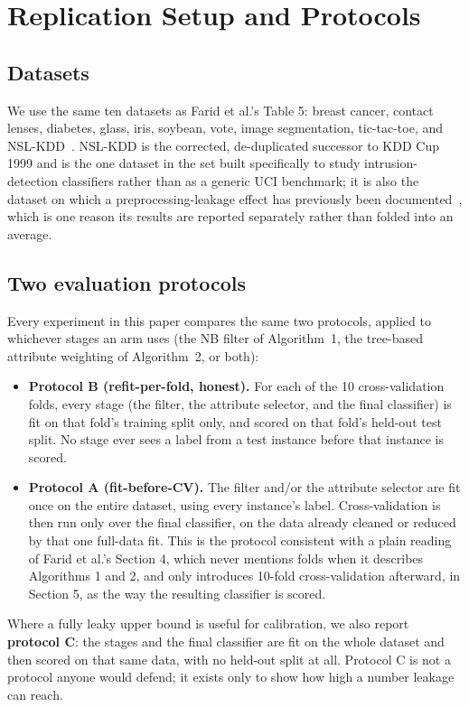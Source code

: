 \section{Replication Setup and Protocols}
\label{sec:setup}

\subsection{Datasets}

We use the same ten datasets as Farid et al.'s Table 5: breast cancer,
contact lenses, diabetes, glass, iris, soybean, vote, image segmentation,
tic-tac-toe, and NSL-KDD~\cite{tavallaee2009detailed}. NSL-KDD is the
corrected, de-duplicated successor to KDD Cup 1999 and is the one dataset
in the set built specifically to study intrusion-detection classifiers
rather than as a generic UCI benchmark; it is also the dataset on which a
preprocessing-leakage effect has previously been
documented~\cite{bouke2023empirical}, which is one reason its results are
reported separately rather than folded into an average.

\subsection{Two evaluation protocols}

Every experiment in this paper compares the same two protocols, applied to
whichever stages an arm uses (the NB filter of Algorithm~1, the tree-based
attribute weighting of Algorithm~2, or both):
\begin{itemize}
\item \textbf{Protocol B (refit-per-fold, honest).} For each of the 10
cross-validation folds, every stage (the filter, the attribute
selector, and the final classifier) is fit on that fold's training
split only, and scored on that fold's held-out test split. No stage ever
sees a label from a test instance before that instance is scored.
\item \textbf{Protocol A (fit-before-CV).} The filter and/or the attribute
selector are fit once on the entire dataset, using every instance's label.
Cross-validation is then run only over the final classifier, on the data
already cleaned or reduced by that one full-data fit. This is the protocol
consistent with a plain reading of Farid et al.'s Section 4, which never
mentions folds when it describes Algorithms 1 and 2, and only introduces
10-fold cross-validation afterward, in Section 5, as the way the resulting
classifier is scored.
\end{itemize}
Where a fully leaky upper bound is useful for calibration, we also report
\textbf{protocol C}: the stages and the final classifier are fit on the
whole dataset and then scored on that same data, with no held-out split at
all. Protocol C is not a protocol anyone would defend; it exists only to
show how high a number leakage can reach.

